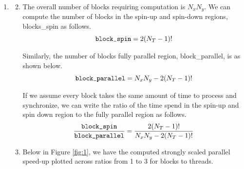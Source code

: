 \documentclass[11pt]{article}
\begin{document}
\begin{enumerate}[leftmargin=0.9in]
\begin{enumerate}[leftmargin=0.3in]
   \end{enumerate} %

 \item %

   \begin{enumerate}[leftmargin=0.3in]
     \setcounter{enumii}{1}
     \item
       The overall number of blocks requiring computation is $N_x N_y$. We can compute the number of blocks in the spin-up and spin-down regions, {\selectfont blocks\_spin} as follows.
       \begin{equation}
         \text{{\fontfamily{cmtt}\selectfont block\_spin}} = 2(N_T - 1)!
       \end{equation}

       Similarly, the number of blocks fully parallel region, {\selectfont block\_parallel}, is as shown below.
      \begin{equation}
        \text{{\fontfamily{cmtt}\selectfont block\_parallel}} = N_x N_y - 2(N_T - 1)!
      \end{equation}

      If we assume every block takes the same amount of time to process and synchronize, we can write the ratio of the time spend in the spin-up and spin down region to the fully parallel region as follows.
      \begin{equation}
        \frac{\text{{\fontfamily{cmtt}\selectfont block\_spin}}}{\text{{\fontfamily{cmtt}\selectfont block\_parallel}}} = \frac{2(N_T - 1)!}{N_x N_y - 2(N_T - 1)!}
      \end{equation}

   \newpage
 
 \item

   Below in Figure \ref{fig:1}, we have the computed strongly scaled parallel speed-up plotted across ratios from 1 to 3 for blocks to threads. 
   

\end{enumerate}
\end{enumerate}
\end{document}
